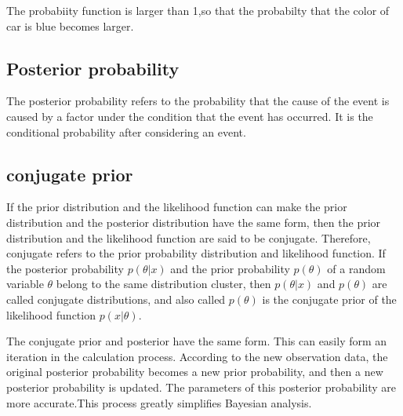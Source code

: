 The probabiity function is larger than 1,so that the probabilty that the color of car is blue becomes  larger.

\subsection{Posterior probability}
The posterior probability refers to the probability that the cause of the event is caused by a factor under the condition that the event has occurred. It is the conditional probability after considering an event.

\subsection{conjugate prior}
If the prior distribution and the likelihood function can make the prior distribution and the posterior distribution  have the same form, then the prior distribution and the likelihood function are said to be conjugate. Therefore, conjugate refers to the prior probability distribution and likelihood function. If the posterior probability $p(\theta|x)$ and the  prior probability $p(\theta)$ of a random variable $\theta$ belong to the same distribution cluster, then $p(\theta|x)$ and $p(\theta)$ are called conjugate distributions, and  also called $p(\theta)$ is the conjugate prior of the likelihood function $p(x|\theta)$.

The conjugate prior and posterior have the same form. This can easily form an iteration in the calculation process. According to the new observation data, the original posterior probability becomes a new prior probability, and then a new posterior probability is updated. The parameters of this posterior probability are more accurate.This process greatly simplifies Bayesian analysis.
